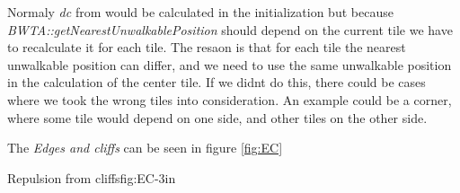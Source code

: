 	Normaly \textit{dc} from  would be calculated in the initialization but because \textit{BWTA::getNearestUnwalkablePosition} should depend on the current tile we have to recalculate it for each tile. The resaon is that for each tile the nearest unwalkable position can differ, and we need to use the same unwalkable position in the calculation of the center tile. If we didnt do this, there could be cases where we took the wrong tiles into consideration. An example could be a corner, where some tile would depend on one side, and other tiles on the other side.
	
	The \textit{Edges and cliffs} can be seen in figure \ref{fig:EC}

			{Repulsion from cliffs}{fig:EC}{-3in}
